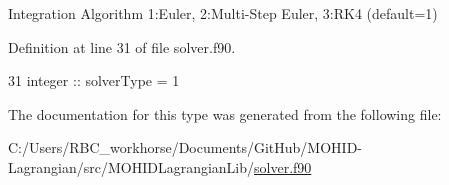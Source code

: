 Integration Algorithm 1\+:Euler, 2\+:Multi-\/\+Step Euler, 3\+:R\+K4 (default=1) 



Definition at line 31 of file solver.\+f90.


\begin{DoxyCode}
31         \textcolor{keywordtype}{integer} :: solverType = 1
\end{DoxyCode}


The documentation for this type was generated from the following file\+:\begin{DoxyCompactItemize}
\item 
C\+:/\+Users/\+R\+B\+C\+\_\+workhorse/\+Documents/\+Git\+Hub/\+M\+O\+H\+I\+D-\/\+Lagrangian/src/\+M\+O\+H\+I\+D\+Lagrangian\+Lib/\mbox{\hyperlink{solver_8f90}{solver.\+f90}}\end{DoxyCompactItemize}
